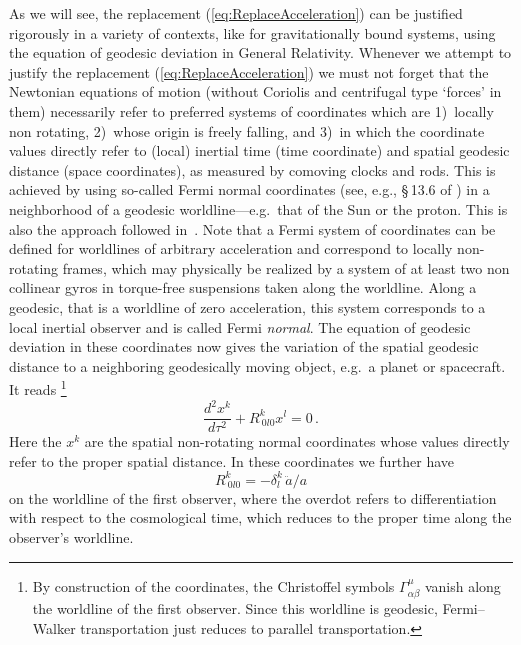 \documentclass
[rmp,aps,twocolumn,showpacs,preprintnumbers,amsmath,amssymb]{revtex4}
\theoremstyle{plain}
\theoremstyle{definition}
\theoremstyle{remark}
\begin{document}
As we will see, the replacement (\ref{eq:ReplaceAcceleration}) can be 
justified rigorously in a variety of contexts, like for gravitationally 
bound systems, using the equation of geodesic deviation in General 
Relativity. Whenever we attempt to justify the replacement 
(\ref{eq:ReplaceAcceleration}) we must not forget that the Newtonian 
equations of motion (without Coriolis and centrifugal type `forces' in 
them) necessarily refer to preferred systems of coordinates which are 
1)~locally non rotating,
2)~whose origin is freely falling, and 
3)~in which the coordinate values directly refer to (local) inertial 
time (time coordinate) and spatial geodesic distance (space coordinates), 
as measured by comoving clocks and rods.
This is achieved by using so-called Fermi normal coordinates (see, e.g., 
\S\,13.6 of \cite{Misner.Thorne.Wheeler:Gravitation}) in a neighborhood 
of a geodesic worldline---e.g.~that of the Sun or the proton. This is also 
the approach followed in~\cite{Cooperstock.etal:1998}. Note that a 
Fermi system of coordinates can be defined for worldlines of arbitrary 
acceleration and correspond to locally non-rotating frames, which may 
physically be realized by a system of at least two non collinear gyros 
in torque-free suspensions taken along the worldline. Along a geodesic, 
that is a worldline of zero acceleration, this system corresponds to 
a local inertial observer and is called Fermi \emph{normal}. 
The equation of geodesic deviation in these coordinates now gives the 
variation of the spatial geodesic distance to a neighboring geodesically 
moving object, e.g.~a planet or spacecraft. It reads%
\footnote{By construction of the coordinates, the Christoffel symbols 
$\Gamma^\mu_{\alpha\beta}$ vanish along the worldline of the first observer. 
Since this worldline is geodesic, Fermi--Walker transportation just reduces 
to parallel transportation.} 
%
\begin{equation}\label{eq:GeodDev}
  \frac{d^2x^k}{d\tau^2} + R^k_{\ 0l0 }x^l = 0\,.
\end{equation}
%
Here the $x^k$ are the spatial non-rotating normal coordinates whose 
values directly refer to the proper spatial distance. In these 
coordinates we further have~\cite{Cooperstock.etal:1998}
%
\begin{equation}\label{eq:GeodDevCurv}
  R^k_{\ 0l0 } = - \delta^k_l \, \ddot a/a
\end{equation}
%
on the worldline of the first observer, where the overdot refers to 
differentiation with respect to the cosmological time, which reduces 
to the proper time along the observer's worldline.    
\end{document}
